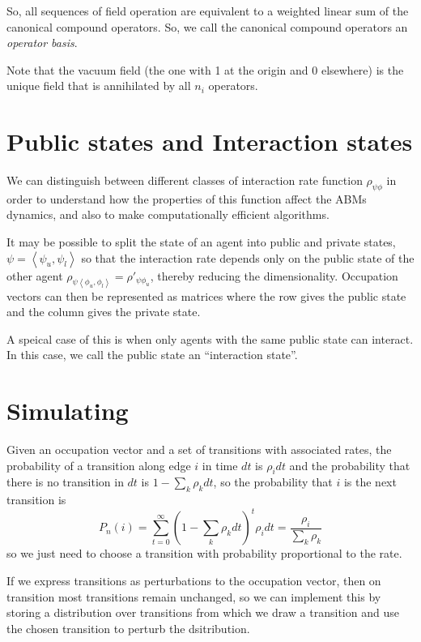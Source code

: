 \documentclass[a4paper]{article}
\begin{document}
So, all sequences of field operation are equivalent to  a weighted linear sum of the canonical compound operators. So, we call the canonical compound operators an \textit{operator basis}.

Note that the vacuum field (the one with 1 at the origin and 0 elsewhere) is the unique field that is annihilated by all $n_i$ operators.

\section{Public states and Interaction states}

We can distinguish between different classes of interaction rate function $\rho_{\psi\phi}$ in order to understand how the properties of this function affect the ABMs dynamics, and also to make computationally efficient algorithms.

It may be possible to split the state of an agent into public and private states, $\psi = \left<\psi_u, \psi_l\right>$ so that the interaction rate depends only on the public state of the other agent $\rho_{\psi\left<\phi_u,\phi_l\right>} = \rho'_{\psi\phi_u}$, thereby reducing the dimensionality. Occupation vectors can then be represented as matrices where the row gives the public state and the column gives the private state.

A speical case of this is when only agents with the same public state can interact. In this case, we call the public state an ``interaction state''.

\section{Simulating}

Given an occupation vector and a set of transitions with associated rates, the probability of a transition along edge $i$ in time $dt$ is $\rho_i dt$ and the probability that there is no transition in $dt$ is $1-\sum_k \rho_k dt$, so the probability that $i$ is the next transition is
\[
P_n(i) = \sum_{t=0}^\infty (1-\sum_k \rho_k dt)^t \rho_i dt = \frac{\rho_i}{\sum_k \rho_k}
\]
so we just need to choose a transition with probability proportional to the rate.

If we express transitions as perturbations to the occupation vector, then on transition most transitions remain unchanged, so we can implement this by storing a distribution over transitions from which we draw a transition and use the chosen transition to perturb the dsitribution.
\end{document}
